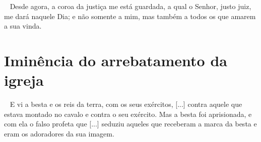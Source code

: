 \documentclass[12pt,aspectratio=169]{beamer}
\newcommand{\ver}[1]{%
    \raisebox{0.50ex}{%
        \scalebox{1.1}{%
            \pmb{\textbf{\textcolor{BSpbg}{#1}}}%
        }%
    }%
}
\newcommand{\QUOTE}[1]{%
    \par\noindent\hspace*{0.1\linewidth}%
    \begin{minipage}{0.8\linewidth}%
        \linespread{1.35}\large{#1}%
    \end{minipage}%
}
\newcommand{\ORA}[1]{{\textcolor{TXora}{#1}}}
\newcommand{\YEL}[1]{{\textcolor{TXyel}{#1}}}
\newcommand{\GRE}[1]{{\textcolor{TXgre}{#1}}}
\newcommand{\MAG}[1]{{\textcolor{TXmag}{#1}}}
\newcommand{\BRI}[1]{{\textcolor{BSpbg}{#1}}}   %
\begin{document}
    \begin{frame}
        \QUOTE{%
            \ver{(ARC) 2Tm~4.8}~%
            Desde agora, a \YEL{coroa da justiça} me está guardada, a qual o  Senhor,  justo
            juiz, me dará naquele Dia; e \GRE{não somente a mim}, mas também a \MAG{todos os
            que amarem a sua vinda}.
        }
    \end{frame}

\section{Iminência do arrebatamento da igreja}

    \begin{frame}
        \QUOTE{%
            \ver{(ARA) Ap~19.19,20}~%
            E vi a \YEL{besta} e os reis da terra,  com  os  seus  exércitos,  [...]  contra
            \BRI{aquele que estava montado no  cavalo}  e  contra  o  seu  exército.  Mas  a
            \YEL{besta} foi aprisionada, e com ela o \ORA{falso profeta} que  [...]  seduziu
            aqueles que receberam a \MAG{marca da besta} e eram os  adoradores  da  \GRE{sua
            imagem}. \\[\bigskipamount]
        }
    \end{frame}



\end{document}
